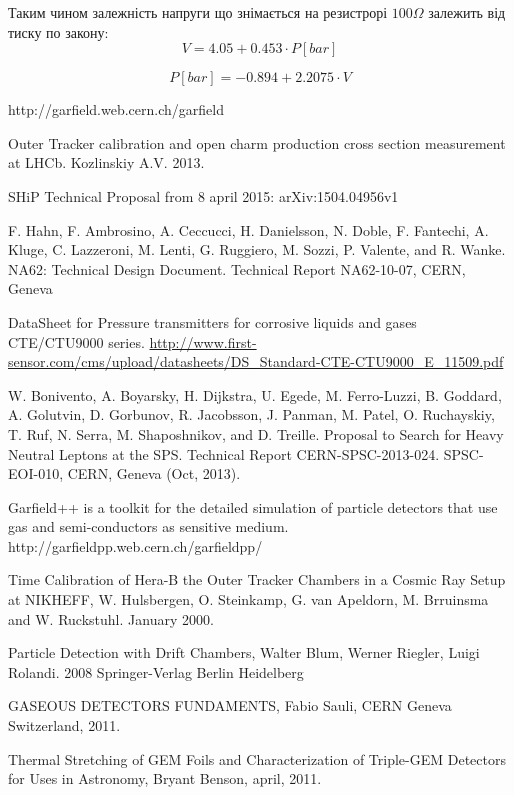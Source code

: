 \documentclass[pdftex,14pt]{scrartcl}
\begin{document}
\begin{spacing}{1.5}
	Таким чином залежність напруги що знімається на резистрорі $100\Omega$ залежить від тиску по закону:
	\begin{equation}
	V = 4.05 + 0.453 \cdot P[bar]
	\end{equation}

	\begin{equation}	
	P[bar] = -0.894 + 2.2075 \cdot V
	\end{equation}

\newpage
\begin{thebibliography}{00}
	 http://garfield.web.cern.ch/garfield

	Outer Tracker calibration and open charm production cross section measurement at LHCb. Kozlinskiy A.V. 2013. 
	
	 SHiP Technical Proposal from 8 april 2015: arXiv:1504.04956v1	
	
	 F. Hahn, F. Ambrosino, A. Ceccucci, H. Danielsson, N. Doble, F. Fantechi, A. Kluge, C. Lazzeroni, M. Lenti, G. Ruggiero, M. Sozzi, P. Valente, and R. Wanke. NA62: Technical Design Document. Technical Report NA62-10-07, CERN, Geneva
	
	 DataSheet for Pressure transmitters for corrosive liquids and gases CTE/CTU9000 series. \url{http://www.first-sensor.com/cms/upload/datasheets/DS_Standard-CTE-CTU9000_E_11509.pdf}
	
	 W. Bonivento, A. Boyarsky, H. Dijkstra, U. Egede, M. Ferro-Luzzi, B. Goddard, A. Golutvin, D. Gorbunov, R. Jacobsson, J. Panman, M. Patel, O. Ruchayskiy, T. Ruf, N. Serra, M. Shaposhnikov, and D. Treille. Proposal to Search for Heavy Neutral Leptons at the SPS. Technical Report CERN-SPSC-2013-024. SPSC-EOI-010, CERN, Geneva (Oct, 2013).
	
	 Garfield++ is a toolkit for the detailed simulation of particle detectors that use gas and semi-conductors as sensitive medium. http://garfieldpp.web.cern.ch/garfieldpp/

	
	 Time Calibration of Hera-B the Outer Tracker Chambers in a Cosmic Ray Setup  at NIKHEFF, W. Hulsbergen, O. Steinkamp,  G. van Apeldorn, M. Brruinsma and W. Ruckstuhl. January 2000.
	
	 Particle Detection with Drift Chambers, Walter Blum, Werner Riegler, Luigi Rolandi. 2008 Springer-Verlag Berlin Heidelberg
	
	 GASEOUS DETECTORS FUNDAMENTS, Fabio Sauli, CERN Geneva Switzerland, 2011.
	
	 Thermal Stretching of GEM Foils and Characterization of Triple-GEM Detectors  for Uses in Astronomy, Bryant Benson, april, 2011.
\end{thebibliography}


	\end{spacing}
\end{document}
